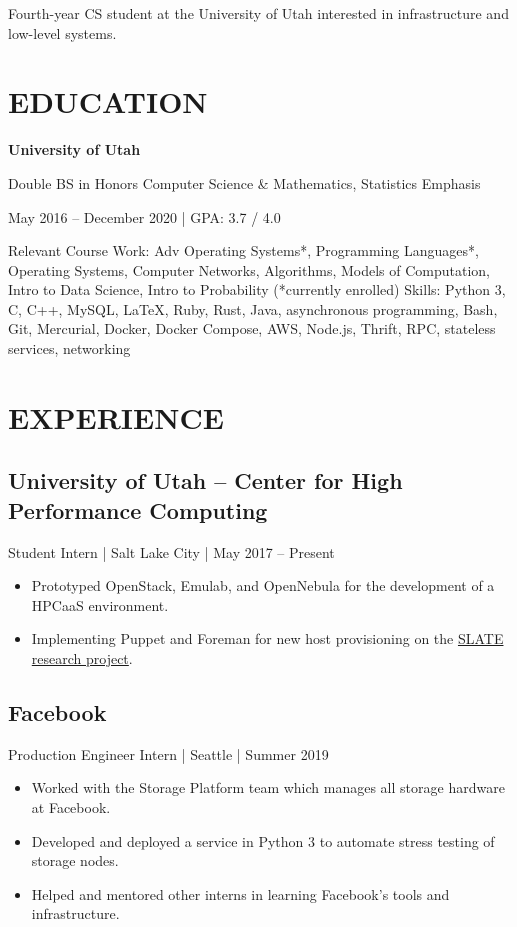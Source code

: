 \documentclass[10pt, letterpaper]{resume}
\begin{document}
\maketitle

{\centering
  Fourth-year CS student at the University of Utah interested in infrastructure and low-level systems.
  \par
}

\section{EDUCATION}
{\centering
  \textbf{University of Utah}

  Double BS in Honors Computer Science \& Mathematics, Statistics Emphasis

  May 2016 -- December 2020 | GPA: 3.7 / 4.0
  \par
}
\vspace{10pt}
{{\selectfont Relevant Course Work:}
Adv Operating Systems*, Programming Languages*, Operating Systems, Computer Networks, Algorithms, Models of Computation, Intro to Data Science, Intro to Probability {\footnotesize(*currently enrolled)}}
\smallbreak
{{\selectfont Skills:} Python 3, C, C++, MySQL, \LaTeX, Ruby, Rust, Java, asynchronous programming, Bash, Git, Mercurial, Docker, Docker Compose, AWS, Node.js, Thrift, RPC, stateless services, networking}

\section{EXPERIENCE}
\subsection{University of Utah -- Center for High Performance Computing}
Student Intern | Salt Lake City | May 2017 -- Present
\begin{itemize}
  \item Prototyped OpenStack, Emulab, and OpenNebula for the development of a HPCaaS environment.
  \item Implementing Puppet and Foreman for new host provisioning on the \href{https://slateci.io}{SLATE research project}.
\end{itemize}

\subsection{Facebook}
Production Engineer Intern | Seattle | Summer 2019
\begin{itemize}
  \item Worked with the Storage Platform team which manages all storage hardware at Facebook.
  \item Developed and deployed a service in Python 3 to automate stress testing of storage nodes.
  \item Helped and mentored other interns in learning Facebook's tools and infrastructure.
\end{itemize}
\end{document}
